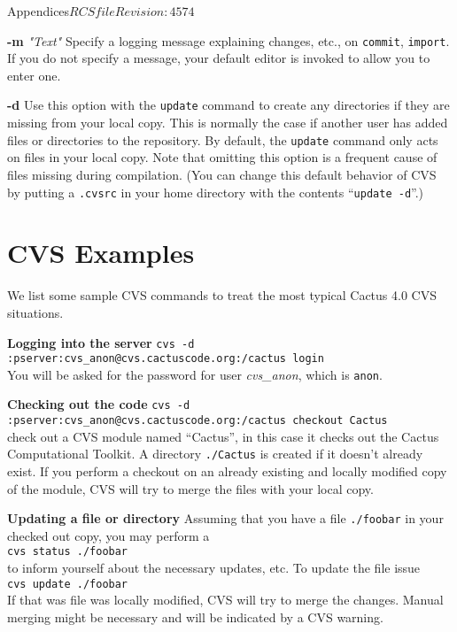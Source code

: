 \begin{cactuspart}{Appendices}{$RCSfile$}{$Revision: 4574 $}
\begin{Lentry}
\item[{\bf -m} \textit{"Text"}]
Specify a logging message explaining changes, etc., on {\tt commit},
{\tt import}. If you do not specify a message, your default editor
is invoked to allow you to enter one.

\item[\bf -d]
Use this option with the {\tt update} command to create any
directories if they are missing from your local copy. This is normally
the case if another user has added files or directories to the
repository. By default, the {\tt update} command only acts on files in
your local copy. Note that omitting this option is a frequent cause of
files missing during compilation.  (You can change this
default behavior of CVS by putting a {\tt .cvsrc} in your home directory
with the contents ``{\tt update -d}''.)

\end{Lentry}

\section{CVS Examples}
We list some sample CVS commands to treat the most typical Cactus 4.0
CVS situations.
\begin{description}
\item\textbf{Logging into the server}\newline
{\tt cvs -d :pserver:cvs\_anon@cvs.cactuscode.org:/cactus
login} \\ You will be asked for the password for user \textit{cvs\_anon}, which is {\tt anon}.

\item\textbf{Checking out the code}\newline
{\tt cvs -d :pserver:cvs\_anon@cvs.cactuscode.org:/cactus
checkout Cactus}\\
check out a CVS module named ``Cactus'', in this case it checks out the
Cactus Computational Toolkit. A directory {\tt ./Cactus} is created if
it doesn't already exist. If you perform a checkout on an already
existing and locally modified copy of the module, CVS will try to merge the files
with your local copy.

\item\textbf{Updating a file or directory}\newline
Assuming that you have a file {\tt ./foobar} in your checked out
copy, you may perform a \\
{\tt cvs status ./foobar}\\
to inform yourself about the necessary updates, etc. To update the
file issue \\
{\tt cvs update ./foobar}\\
If that was file was locally modified, CVS will try to merge the
changes. Manual merging might be necessary and will be indicated by a
CVS warning.


\end{description}
\end{cactuspart}
